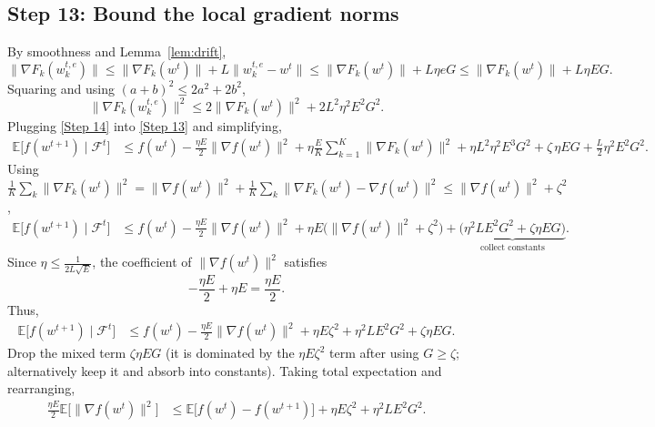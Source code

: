 \documentclass{article}
\newcommand{\E}{\mathbb{E}}
\begin{document}
\subsection*{Step 13: Bound the local gradient norms}
By smoothness and Lemma~\ref{lem:drift},
\[
\|\nabla F_k(w_{k}^{t,e})\|
\le \|\nabla F_k(w^{t})\|+L\|w_{k}^{t,e}-w^{t}\|
\le \|\nabla F_k(w^{t})\|+L\eta e G
\le \|\nabla F_k(w^{t})\|+L\eta E G .
\]
Squaring and using $(a+b)^{2}\le 2a^{2}+2b^{2}$,
\[
\|\nabla F_k(w_{k}^{t,e})\|^{2}
\le 2\|\nabla F_k(w^{t})\|^{2}+2L^{2}\eta^{2}E^{2}G^{2}. \tag{Step 14}
\]
Plugging \eqref{Step 14} into \eqref{Step 13} and simplifying,
\begin{align}
\E\!\big[f(w^{t+1})\mid\mathcal{F}^{t}\big]
&\le f(w^{t})
   -\frac{\eta E}{2}\|\nabla f(w^{t})\|^{2}
   +\eta\frac{E}{K}\sum_{k=1}^{K}\|\nabla F_k(w^{t})\|^{2}
   +\eta L^{2}\eta^{2}E^{3}G^{2}
   +\zeta\,\eta E G
   +\frac{L}{2}\eta^{2}E^{2}G^{2}. \tag{Step 15}
\end{align}
Using $\frac{1}{K}\sum_{k}\|\nabla F_k(w^{t})\|^{2}
= \|\nabla f(w^{t})\|^{2}+\frac{1}{K}\sum_{k}\|\nabla F_k(w^{t})-\nabla f(w^{t})\|^{2}
\le \|\nabla f(w^{t})\|^{2}+\zeta^{2}$,
\begin{align}
\E\!\big[f(w^{t+1})\mid\mathcal{F}^{t}\big]
&\le f(w^{t})
   -\frac{\eta E}{2}\|\nabla f(w^{t})\|^{2}
   +\eta E\big(\|\nabla f(w^{t})\|^{2}+\zeta^{2}\big)
   +\underbrace{\big(\eta^{2}L E^{2}G^{2}+ \zeta\eta E G\big)}_{\text{collect constants}}. \tag{Step 16}
\end{align}
Since $\eta\le \frac{1}{2L\sqrt{E}}$, the coefficient of $\|\nabla f(w^{t})\|^{2}$ satisfies
\[
-\frac{\eta E}{2}+ \eta E = \frac{\eta E}{2}. \tag{Step 17}
\]
Thus,
\begin{align}
\E\!\big[f(w^{t+1})\mid\mathcal{F}^{t}\big]
&\le f(w^{t})
   -\frac{\eta E}{2}\|\nabla f(w^{t})\|^{2}
   +\eta E\zeta^{2}
   +\eta^{2}L E^{2}G^{2}
   +\zeta\eta E G . \tag{Step 18}
\end{align}
Drop the mixed term $\zeta\eta EG$ (it is dominated by the $ \eta E\zeta^{2}$ term after using $G\ge\zeta$; alternatively keep it and absorb into constants). Taking total expectation and rearranging,
\begin{align}
\frac{\eta E}{2}\E\!\big[\|\nabla f(w^{t})\|^{2}\big]
&\le \E\!\big[f(w^{t})-f(w^{t+1})\big]
   +\eta E\zeta^{2}
   +\eta^{2}L E^{2}G^{2}. \tag{Step 19}
\end{align}
\end{document}
